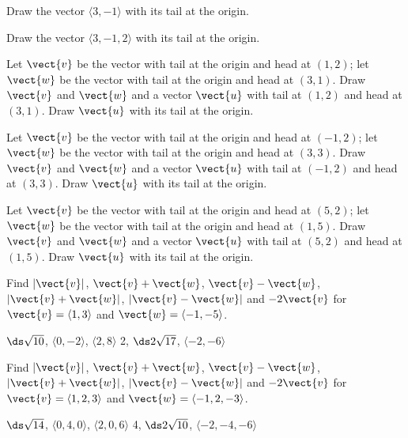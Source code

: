 \begin{enumialphparenastyle}

\begin{ex}
Draw the vector $\langle 3,-1\rangle$ with its tail at the
origin. 
\end{ex}

\begin{ex}
Draw the vector $\langle 3,-1,2\rangle$ with its tail at the
origin. 
\end{ex}

\begin{ex}
Let $\vect{v}$ be the vector with tail at the origin and head
at $(1,2)$; let $\vect{w}$ be the vector with tail at the origin and head
at $(3,1)$. Draw $\vect{v}$ and $\vect{w}$ and a vector $\vect{u}$ with 
tail at $(1,2)$ and head at $(3,1)$. Draw $\vect{u}$ with its tail at the origin.
\end{ex}

\begin{ex}
Let $\vect{v}$ be the vector with tail at the origin and head
at $(-1,2)$; let $\vect{ w}$ be the vector with tail at the origin and head
at $(3,3)$. Draw $\vect{v}$ and $\vect{w}$ and a vector $\vect{u}$ with 
tail at $(-1,2)$ and head at $(3,3)$. Draw $\vect{u}$ with its tail at the origin.
\end{ex}

\begin{ex}
Let $\vect{v}$ be the vector with tail at the origin and head
at $(5,2)$; let $\vect{w}$ be the vector with tail at the origin and head
at $(1,5)$. Draw $\vect{v}$ and $\vect{w}$ and a vector $\vect{u}$ with 
tail at $(5,2)$ and head at $(1,5)$. Draw $\vect{u}$ with its tail at the origin.
\end{ex}

\begin{ex}
Find $|\vect{v}|$, $\vect{v}+\vect{w}$, $\vect{v}-\vect{w}$,
$|\vect{v}+\vect{w}|$, $|\vect{v}-\vect{w}|$ and $-2\vect{v}$ for
$\vect{v} = \langle 1,3\rangle$ and $\vect{w} = \langle -1,-5\rangle$.
\begin{sol}
$\ds \sqrt{10}$, $\langle 0,-2\rangle$, $\langle 2,8\rangle$
2, $\ds 2\sqrt{17}$, $\langle -2,-6\rangle$
\end{sol}
\end{ex}

\begin{ex}
Find $|\vect{v}|$, $\vect{v}+\vect{w}$, $\vect{v}-\vect{w}$,
$|\vect{v}+\vect{w}|$, $|\vect{v}-\vect{w}|$ and $-2\vect{v}$ for
$\vect{v} = \langle 1,2,3\rangle$ and $\vect{w} = \langle -1,2,-3\rangle$.
\begin{sol}
$\ds \sqrt{14}$, $\langle 0,4,0\rangle$, $\langle 2,0,6\rangle$
4, $\ds 2\sqrt{10}$, $\langle -2,-4,-6\rangle$
\end{sol}
\end{ex}


\end{enumialphparenastyle}
